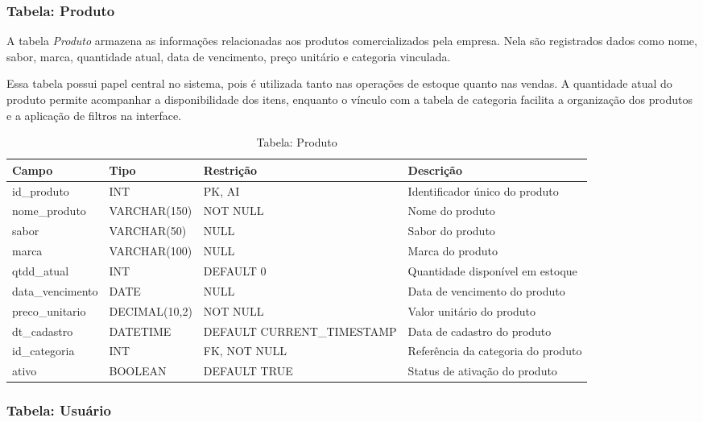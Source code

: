 \subsubsection{Tabela: Produto}

A tabela \textit{Produto} armazena as informações relacionadas aos produtos comercializados pela empresa. Nela são registrados dados como nome, sabor, marca, quantidade atual, data de vencimento, preço unitário e categoria vinculada.

Essa tabela possui papel central no sistema, pois é utilizada tanto nas operações de estoque quanto nas vendas. A quantidade atual do produto permite acompanhar a disponibilidade dos itens, enquanto o vínculo com a tabela de categoria facilita a organização dos produtos e a aplicação de filtros na interface.

\begin{table}[H]
\centering
\begin{tabular}{|p{3cm}|p{3cm}|p{3cm}|p{5cm}|}
\hline
\textbf{Campo} & \textbf{Tipo} & \textbf{Restrição} & \textbf{Descrição} \\ \hline
id\_produto & INT & PK, AI & Identificador único do produto \\ \hline
nome\_produto & VARCHAR(150) & NOT NULL & Nome do produto \\ \hline
sabor & VARCHAR(50) & NULL & Sabor do produto \\ \hline
marca & VARCHAR(100) & NULL & Marca do produto \\ \hline
qtdd\_atual & INT & DEFAULT 0 & Quantidade disponível em estoque \\ \hline
data\_vencimento & DATE & NULL & Data de vencimento do produto \\ \hline
preco\_unitario & DECIMAL(10,2) & NOT NULL & Valor unitário do produto \\ \hline
dt\_cadastro & DATETIME & DEFAULT CURRENT\_TIMESTAMP & Data de cadastro do produto \\ \hline
id\_categoria & INT & FK, NOT NULL & Referência da categoria do produto \\ \hline
ativo & BOOLEAN & DEFAULT TRUE & Status de ativação do produto \\ \hline
\end{tabular}
\caption{Tabela: Produto}
\end{table}

\subsubsection{Tabela: Usuário}

